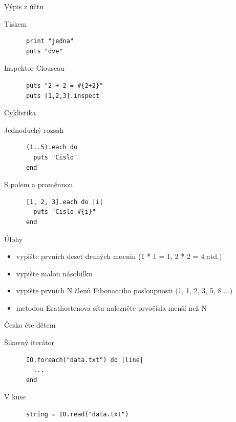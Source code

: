 \documentclass{beamer}
\begin{document}
\begin{frame}[fragile]{Výpis z účtu}
  \begin{block}{Tiskem}
    \begin{verbatim}
      print "jedna"
      puts "dve"
    \end{verbatim}
  \end{block}
  \pause
  \begin{block}{Inspektor Clouseau}
    \begin{verbatim}
      puts "2 + 2 = #{2+2}"
      puts [1,2,3].inspect
    \end{verbatim}
  \end{block}
\end{frame}

\begin{frame}[fragile]{Cyklistika}
  \begin{block}{Jednoduchý rozsah}
    \begin{verbatim}
      (1..5).each do
        puts "Cislo"
      end
    \end{verbatim}
  \end{block}
  \pause
  \begin{block}{S polem a proměnnou}
    \begin{verbatim}
      [1, 2, 3].each do |i|
        puts "Cislo #{i}"
      end
    \end{verbatim}
  \end{block}
\end{frame}

\begin{frame}{Úlohy}
  \begin{itemize}
    \item vypište prvních deset druhých mocnin (1 * 1 = 1, 2 * 2 = 4 atd.)
    \item vypište malou násobilku
    \item vypište prvních N členů Fibonacciho posloupnosti (1, 1, 2, 3, 5, 8 ...)
    \item metodou Erathostenova síta nalezněte prvočísla menší než N
  \end{itemize}
\end{frame}

\begin{frame}[fragile]{Česko čte dětem}
  \begin{block}{Šikovný iterátor}
    \begin{verbatim}
      IO.foreach("data.txt") do |line|
        ...
      end
    \end{verbatim}
  \end{block}
  \pause
  \begin{block}{V kuse}
    \begin{verbatim}
      string = IO.read("data.txt")
    \end{verbatim}
  \end{block}
\end{frame}
\end{document}
